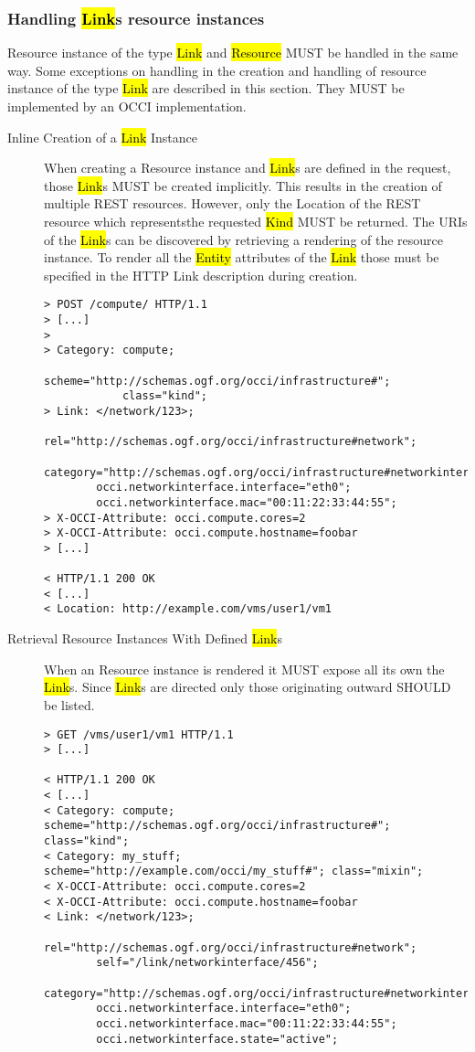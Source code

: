 \documentclass[10pt,a4paper]{article}
\begin{document}
\subsubsection{Handling \hl{Link}s resource instances}
Resource instance of the type \hl{Link} and \hl{Resource} MUST be
handled in the same way. Some exceptions on handling in the creation
and handling of resource instance of the type \hl{Link} are described
in this section. They MUST be implemented by an OCCI implementation.

\begin{description}
  \item[Inline Creation of a \hl{Link} Instance] 
    When creating a Resource instance and \hl{Link}s are defined in the 
    request, those \hl{Link}s MUST be
    created implicitly. This results in the creation of multiple REST
    resources. However, only the Location of the REST resource which
    representsthe requested \hl{Kind} MUST be returned. The URIs of
    the \hl{Link}s can be discovered by retrieving a rendering of the
    resource instance. To render all the \hl{Entity} attributes of
    the \hl{Link} those must be specified in the HTTP Link description
    during creation.

\begin{verbatim}
> POST /compute/ HTTP/1.1
> [...]
> 
> Category: compute; 
            scheme="http://schemas.ogf.org/occi/infrastructure#"; 
            class="kind"; 
> Link: </network/123>;
        rel="http://schemas.ogf.org/occi/infrastructure#network";
        category="http://schemas.ogf.org/occi/infrastructure#networkinterface";
        occi.networkinterface.interface="eth0";
        occi.networkinterface.mac="00:11:22:33:44:55";
> X-OCCI-Attribute: occi.compute.cores=2
> X-OCCI-Attribute: occi.compute.hostname=foobar
> [...]
 
< HTTP/1.1 200 OK
< [...]
< Location: http://example.com/vms/user1/vm1
\end{verbatim}

  \item[Retrieval Resource Instances With
    Defined \hl{Link}s] When an Resource instance is rendered it 
    MUST expose all its own the \hl{Link}s. Since \hl{Link}s are
    directed only those originating outward SHOULD be listed.

\begin{verbatim}
> GET /vms/user1/vm1 HTTP/1.1
> [...]
 
< HTTP/1.1 200 OK
< [...]
< Category: compute; scheme="http://schemas.ogf.org/occi/infrastructure#"; class="kind";
< Category: my_stuff; scheme="http://example.com/occi/my_stuff#"; class="mixin";
< X-OCCI-Attribute: occi.compute.cores=2
< X-OCCI-Attribute: occi.compute.hostname=foobar
< Link: </network/123>;
        rel="http://schemas.ogf.org/occi/infrastructure#network";
        self="/link/networkinterface/456";
        category="http://schemas.ogf.org/occi/infrastructure#networkinterface";
        occi.networkinterface.interface="eth0";
        occi.networkinterface.mac="00:11:22:33:44:55";
        occi.networkinterface.state="active";
\end{verbatim}


\end{description}
\end{document}
